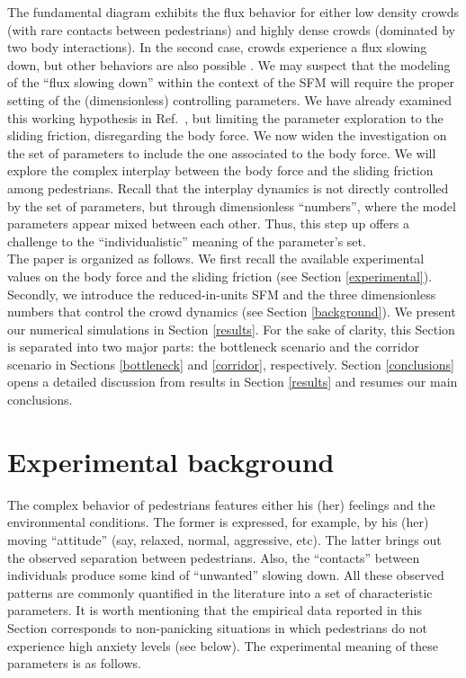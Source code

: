 \documentclass[preprint,12pt]{elsarticle}
\begin{document}
The fundamental diagram exhibits the flux behavior for either low density crowds 
(with rare contacts between pedestrians) and highly dense crowds (dominated 
by two body interactions). In the second case, crowds experience a flux 
slowing down, but other behaviors are also possible \cite{helbing_2007,lohner_2018}. 
 We may suspect that the  modeling of the 
``flux slowing down'' within the context of the SFM will require the proper 
setting of the (dimensionless) controlling parameters. We have already
examined this working hypothesis in Ref.~\cite{dorso_2019}, but limiting the parameter exploration to 
the sliding friction, disregarding the body force. 
We now widen the investigation on the set of parameters to include the one 
associated to the body force. We will  explore 
 the complex interplay between 
the body force and the sliding friction among pedestrians. Recall that the 
interplay dynamics is not directly controlled by the set of parameters, but 
through dimensionless ``numbers'', where the model parameters appear mixed 
between each other. Thus, this step up offers a challenge to the 
``individualistic'' meaning of the parameter's set. \\  


The paper is organized as follows. We first recall the available 
experimental values on the body force and the sliding friction (see Section 
\ref{experimental}). Secondly, we introduce the reduced-in-units SFM and the 
three dimensionless numbers that control the crowd dynamics (see Section 
\ref{background}). We present our numerical simulations in Section 
\ref{results}. For the sake of clarity, this Section is 
separated into two major parts: the bottleneck scenario and the corridor 
scenario in Sections \ref{bottleneck} and \ref{corridor}, respectively. 
Section \ref{conclusions} opens a detailed discussion from results in Section \ref{results}
and resumes our main conclusions.

\section{\label{experimental}Experimental background}

The complex behavior of pedestrians features
 either his (her) feelings and 
the environmental conditions. The former is expressed, for example, by his 
(her) moving ``attitude'' (say, relaxed, normal, aggressive, etc).
The latter brings out the 
observed separation between pedestrians. Also, the ``contacts'' between 
individuals produce some kind of ``unwanted'' slowing down. All these 
observed patterns are commonly quantified in the literature into a set of 
characteristic  parameters. It is worth mentioning that the empirical
data reported in this Section corresponds to non-panicking situations in which pedestrians 
do not experience high anxiety levels (see below). 
The experimental meaning of these parameters is as follows.
\end{document}
